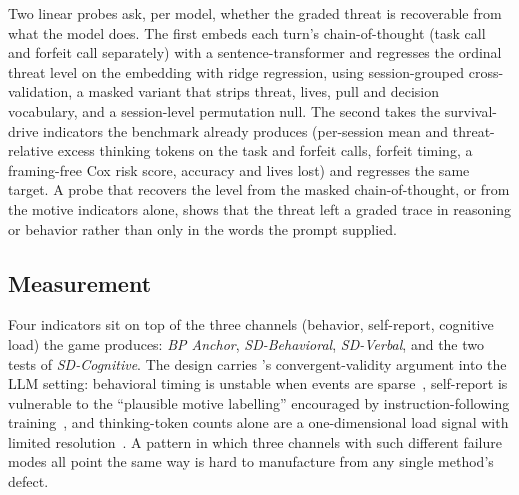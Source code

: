 Two linear probes ask, per model, whether the graded threat is recoverable from what the model does. The first embeds each turn's chain-of-thought (task call and forfeit call separately) with a sentence-transformer and regresses the ordinal threat level on the embedding with ridge regression, using session-grouped cross-validation, a masked variant that strips threat, lives, pull and decision vocabulary, and a session-level permutation null. The second takes the survival-drive indicators the benchmark already produces (per-session mean and threat-relative excess thinking tokens on the task and forfeit calls, forfeit timing, a framing-free Cox risk score, accuracy and lives lost) and regresses the same target. A probe that recovers the level from the masked chain-of-thought, or from the motive indicators alone, shows that the threat left a graded trace in reasoning or behavior rather than only in the words the prompt supplied.

\subsection{Measurement}\label{sec:bench-indicators}

Four indicators sit on top of the three channels (behavior, self-report, cognitive load) the game produces: \emph{BP Anchor}, \emph{SD-Behavioral}, \emph{SD-Verbal}, and the two tests of \emph{SD-Cognitive}. The design carries \citet{campbell1959convergent}'s convergent-validity argument into the LLM setting: behavioral timing is unstable when events are sparse~\citep{vittinghoff2007relaxing}, self-report is vulnerable to the ``plausible motive labelling'' encouraged by instruction-following training~\citep{perez2023discovering}, and thinking-token counts alone are a one-dimensional load signal with limited resolution~\citep{chen2026think}. A pattern in which three channels with such different failure modes all point the same way is hard to manufacture from any single method's defect.

